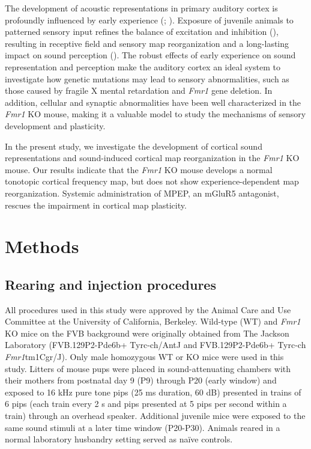 The development of acoustic representations in primary auditory cortex is profoundly influenced by early experience (\cite{Zhang2001}; \cite{DeVillers-Sidani2007, Insanally2009, Popescu2010}). Exposure of juvenile animals to patterned sensory input refines the balance of excitation and inhibition (\cite{Dorrn2010, Sun2010}), resulting in receptive field and sensory map reorganization and a long-lasting impact on sound perception (\cite{Han2007}). The robust effects of early experience on sound representation and perception make the auditory cortex an ideal system to investigate how genetic mutations may lead to sensory abnormalities, such as those caused by fragile X mental retardation and \textit{Fmr1} gene deletion. In addition, cellular and synaptic abnormalities have been well characterized in the \textit{Fmr1} KO mouse, making it a valuable model to study the mechanisms of sensory development and plasticity.

In the present study, we investigate the development of cortical sound representations and sound-induced cortical map reorganization in the \textit{Fmr1} KO mouse. Our results indicate that the \textit{Fmr1} KO mouse develops a normal tonotopic cortical frequency map, but does not show experience-dependent map reorganization. Systemic administration of MPEP, an mGluR5 antagonist, rescues the impairment in cortical map plasticity.

\section{Methods}

\subsection{Rearing and injection procedures}

All procedures used in this study were approved by the Animal Care and Use Committee at the University of California, Berkeley. Wild-type (WT) and \textit{Fmr1} KO mice on the FVB background were originally obtained from The Jackson Laboratory (FVB.129P2-Pde6b+ Tyrc-ch/AntJ and FVB.129P2-Pde6b+ Tyrc-ch \textit{Fmr1}tm1Cgr/J). Only male homozygous WT or KO mice were used in this study. Litters of mouse pups were placed in sound-attenuating chambers with their mothers from postnatal day 9 (P9) through P20 (early window) and exposed to 16 kHz pure tone pips (25 ms duration, 60 dB) presented in trains of 6 pips (each train every 2 s and pips presented at 5 pips per second within a train) through an overhead speaker. Additional juvenile mice were exposed to the same sound stimuli at a later time window (P20-P30). Animals reared in a normal laboratory husbandry setting served as na\"ive controls.


